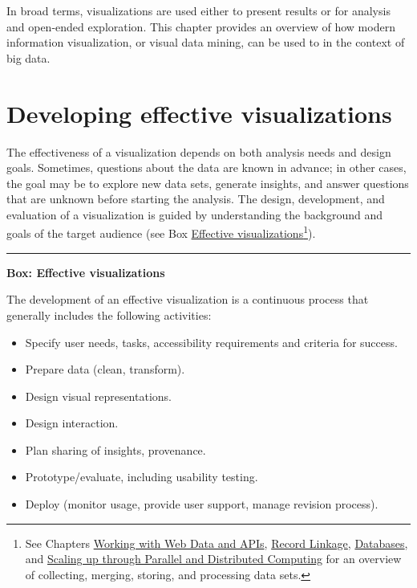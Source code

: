 \documentclass[]{krantz}
\begin{document}
In broad terms, visualizations are used either to present results or for
analysis and open-ended exploration. This chapter provides an overview
of how modern information visualization, or visual data mining, can be
used to in the context of big data.

\section{Developing effective visualizations}\label{sec:viz-2}

The effectiveness of a visualization depends on both analysis needs and
design goals. Sometimes, questions about the data are known in advance;
in other cases, the goal may be to explore new data sets, generate
insights, and answer questions that are unknown before starting the
analysis. The design, development, and evaluation of a visualization is
guided by understanding the background and goals of the target audience
(see Box \protect\hyperlink{box:viz1}{Effective
visualizations}\footnote{See Chapters
  \protect\hyperlink{chap:web}{Working with Web Data and APIs},
  \protect\hyperlink{chap:link}{Record Linkage},
  \protect\hyperlink{chap:db}{Databases}, and
  \protect\hyperlink{chap:parallel}{Scaling up through Parallel and
  Distributed Computing} for an overview of collecting, merging,
  storing, and processing data sets.}).

\begin{center}\rule{0.5\linewidth}{\linethickness}\end{center}

\textbf{Box: Effective visualizations}

The development of an effective visualization is a continuous process
that generally includes the following activities:

\begin{itemize}
\item
  Specify user needs, tasks, accessibility requirements and criteria for
  success.
\item
  Prepare data (clean, transform).
\item
  Design visual representations.
\item
  Design interaction.
\item
  Plan sharing of insights, provenance.
\item
  Prototype/evaluate, including usability testing.
\item
  Deploy (monitor usage, provide user support, manage revision process).
\end{itemize}
\end{document}
